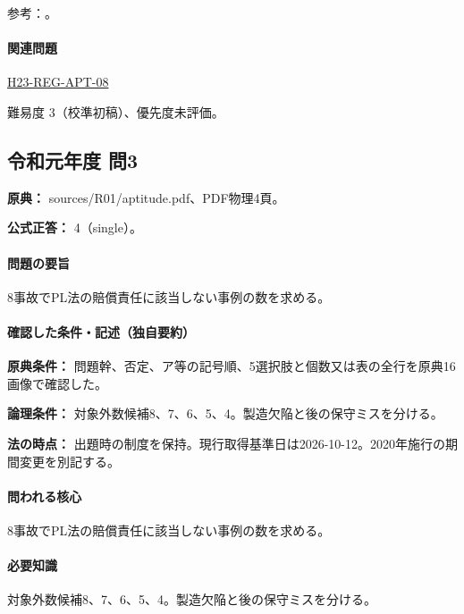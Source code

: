 \par 参考：\cite{pl_statute,pl_qa,pl_definitions2018}。

\paragraph{関連問題} \hyperref[q:h23-reg-apt-08]{H23-REG-APT-08}

\par 難易度 3（校準初稿）、優先度未評価。

\subsection{令和元年度 問3}
\label{q:r01-reg-apt-03}

\noindent\textbf{原典：} sources/R01/aptitude.pdf、PDF物理4頁。

\textbf{公式正答：} 4（single）。

\paragraph{問題の要旨} 8事故でPL法の賠償責任に該当しない事例の数を求める。

\paragraph{確認した条件・記述（独自要約）}\mbox{}\par

\noindent\textbf{原典条件：} 問題幹、否定、ア等の記号順、5選択肢と個数又は表の全行を原典16画像で確認した。\par

\noindent\textbf{論理条件：} 対象外数候補8、7、6、5、4。製造欠陥と後の保守ミスを分ける。\par

\noindent\textbf{法の時点：} 出題時の制度を保持。現行取得基準日は2026-10-12。2020年施行の期間変更を別記する。\par

\paragraph{問われる核心} 8事故でPL法の賠償責任に該当しない事例の数を求める。

\paragraph{必要知識} 対象外数候補8、7、6、5、4。製造欠陥と後の保守ミスを分ける。

